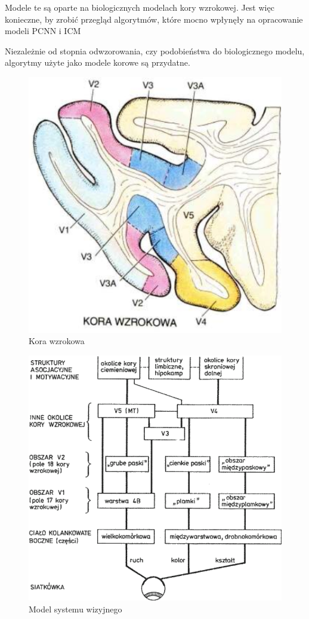 Modele te są oparte na biologicznych modelach kory wzrokowej.
Jest więc konieczne, by zrobić przegląd algorytmów, 
które mocno wpłynęły na opracowanie modeli PCNN i ICM

Niezależnie od stopnia odwzorowania, czy podobieństwa do biologicznego modelu,
algorytmy użyte jako modele korowe są przydatne.
\begin{figure}[H]
 
	\centering
	\includegraphics[width=\textwidth/2]{KoraWzrokowa.png}
	\caption{Kora wzrokowa} \label{fig:Korawzrokowa}
\end{figure} 
\begin{figure}[ht]
	\centering
	\includegraphics[width=\textwidth*4/5]{ModelKory.png}
	\caption{Model systemu wizyjnego} \label{fig:Modelkory}
\end{figure}
